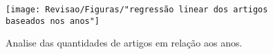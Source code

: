 \begin{figure}[htp!]
	\centering
	\caption{Analise das quantidades de artigos em relação aos anos.}
	\label{fig:regressao-linear-dos-artigos-baseados-nos-anos}
	\texttt{[image: Revisao/Figuras/"regressão linear dos artigos baseados nos anos"]}
	
\end{figure}